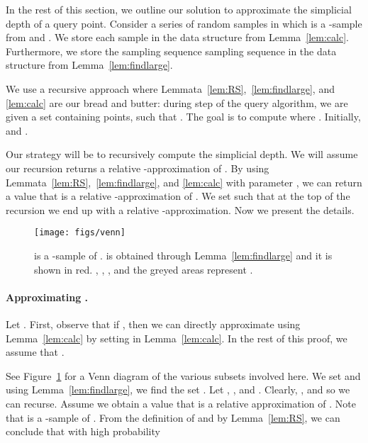 In the rest of this section, we outline our solution to approximate the simplicial depth of a query point.
Consider a series of random samples 
 in which  is a -sample from 
and .
We store each sample  in the data structure from Lemma~\ref{lem:calc}.
Furthermore, we store the sampling sequence
sampling sequence  in the data structure from Lemma~\ref{lem:findlarge}.

We use a recursive approach where Lemmata~\ref{lem:RS},~\ref{lem:findlarge},
and \ref{lem:calc} are our bread and butter: during step  of the query
algorithm, 
we are given a set  containing  points, such that
.
The goal is to compute  where .
Initially,  and .

Our strategy will be to recursively compute the simplicial depth.
We will assume our recursion returns a relative -approximation of
. 
By using Lemmata~\ref{lem:RS},~\ref{lem:findlarge}, and \ref{lem:calc} with parameter , 
we can return a value that is a relative -approximation of 
. 
We set  such that at the top of the recursion we end up
with a relative -approximation. Now we present the details.

\begin{figure}[h]
    \centering
    \texttt{[image: figs/venn]}
    \caption{ is a -sample of . 
     is obtained through Lemma~\ref{lem:findlarge} and it is shown in red.
    , , , and
     the greyed areas represent .}
    \label{fig:venn}
\end{figure}
\paragraph*{Approximating .}
Let .
First, observe that if , then we can directly approximate 
 using Lemma~\ref{lem:calc} by setting  in
Lemma~\ref{lem:calc}.
In the rest of this proof, we assume that .

See Figure~\ref{fig:venn} for a Venn diagram  of the various subsets involved
here.  We set  and using
Lemma~\ref{lem:findlarge}, we find the set . Let
, , and
.  Clearly,
, and  so
we can recurse. Assume we obtain a value  that is a relative  approximation
of .  Note that  is a -sample of .
From the definition of  and by Lemma~\ref{lem:RS}, we can
conclude that with high probability

